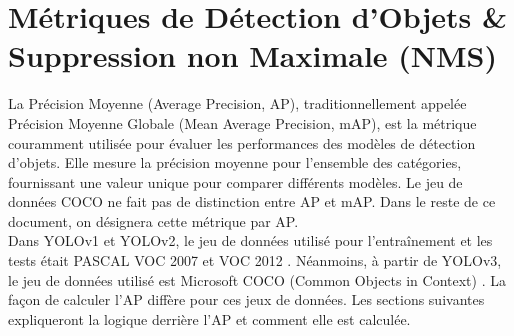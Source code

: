 \documentclass{article}
\begin{document}
\section{Métriques de Détection d'Objets \& Suppression non Maximale (NMS)}
La Précision Moyenne (Average Precision, AP), traditionnellement appelée Précision Moyenne Globale (Mean Average Precision, mAP), est la métrique couramment utilisée pour évaluer les performances des modèles de détection d'objets. Elle mesure la précision moyenne pour l'ensemble des catégories, fournissant une valeur unique pour comparer différents modèles. Le jeu de données COCO ne fait pas de distinction entre AP et mAP. Dans le reste de ce document, on désignera cette métrique par AP.
\vspace{0.2cm}\\
Dans YOLOv1 et YOLOv2, le jeu de données utilisé pour l'entraînement et les tests était PASCAL VOC 2007 et VOC 2012 \cite{36}. Néanmoins, à partir de YOLOv3, le jeu de données utilisé est Microsoft COCO (Common Objects in Context) \cite{37}. La façon de calculer l'AP diffère pour ces jeux de données. Les sections suivantes expliqueront la logique derrière l'AP et comment elle est calculée.
\end{document}
